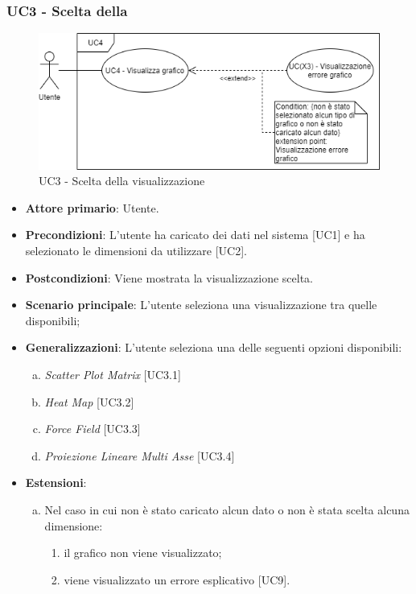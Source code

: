 \subsubsection{UC3 - Scelta della }
\begin{figure}[h]
\includegraphics[width=\linewidth]{section/Images/UC5SceltaVisualizzazione.png}
\centering
\caption{UC3 - Scelta della visualizzazione}
\end{figure}
\begin{itemize}
	\item \textbf{Attore primario}: Utente.
	\item \textbf{Precondizioni}: L'utente ha caricato dei dati nel sistema [UC1] e ha selezionato le dimensioni da utilizzare [UC2].
	\item \textbf{Postcondizioni}: Viene mostrata la visualizzazione scelta.
	\item \textbf{Scenario principale}: L'utente seleziona una visualizzazione tra quelle disponibili;
	\item \textbf{Generalizzazioni}: L'utente seleziona una delle seguenti opzioni disponibili:
		\begin{enumerate}[(a)]
			\item \textit{Scatter Plot Matrix} [UC3.1]
			\item \textit{Heat Map} [UC3.2]
			\item \textit{Force Field} [UC3.3]
			\item \textit{Proiezione Lineare Multi Asse} [UC3.4]
		\end{enumerate}
	\item \textbf{Estensioni}:
	\begin{enumerate}[(a)]
		\item Nel caso in cui non è stato caricato alcun dato o non è stata scelta alcuna dimensione:
		\begin{enumerate}[1.]
			\item il grafico non viene visualizzato;
			\item viene visualizzato un errore esplicativo [UC9].
		\end{enumerate}
	\end{enumerate}
\end{itemize}